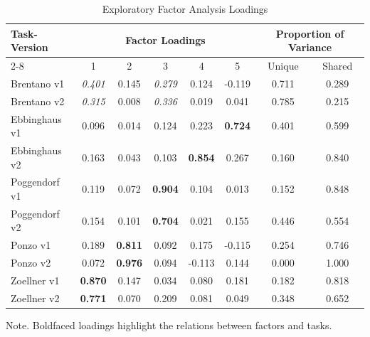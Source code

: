 \begin{table}[htbp]
    \centering
    \caption{Exploratory Factor Analysis Loadings}
    \label{tab:Fac-10}
    \begin{threeparttable}
        \begin{tabular}{l|ccccc|cc}
            \toprule
            Task-Version
            & \multicolumn{5}{c|}{Factor Loadings} & \multicolumn{2}{c}{Proportion of Variance} \\
            \cmidrule{2-8}
             & 1 & 2 & 3 & 4 & 5 & Unique & Shared \\
            \midrule
            Brentano v1 & \textit{0.401} & 0.145 & \textit{0.279} & 0.124 & -0.119 & 0.711 & 0.289 \\
            Brentano v2 & \textit{0.315} & 0.008 & \textit{0.336} & 0.019 & 0.041 & 0.785 & 0.215 \\
            Ebbinghaus v1 & 0.096 & 0.014 & 0.124 & 0.223 & \textbf{0.724} & 0.401 & 0.599 \\
            Ebbinghaus v2 & 0.163 & 0.043 & 0.103 & \textbf{0.854} & 0.267 & 0.160 & 0.840 \\
            Poggendorf v1 & 0.119 & 0.072 & \textbf{0.904} & 0.104 & 0.013 & 0.152 & 0.848 \\
            Poggendorf v2 & 0.154 & 0.101 & \textbf{0.704} & 0.021 & 0.155 & 0.446 & 0.554 \\
            Ponzo v1 & 0.189 & \textbf{0.811} & 0.092 & 0.175 & -0.115 & 0.254 & 0.746 \\
            Ponzo v2 & 0.072 & \textbf{0.976} & 0.094 & -0.113 & 0.144 & 0.000 & 1.000 \\
            Zoellner v1 & \textbf{0.870} & 0.147 & 0.034 & 0.080 & 0.181 & 0.182 & 0.818 \\
            Zoellner v2 & \textbf{0.771} & 0.070 & 0.209 & 0.081 & 0.049 & 0.348 & 0.652 \\
            \bottomrule
        \end{tabular}
        \vspace{5pt}
        \begin{tablenotes}
            \small
            \item Note. Boldfaced loadings highlight the relations between factors and tasks.
        \end{tablenotes}
    \end{threeparttable}
\end{table}


